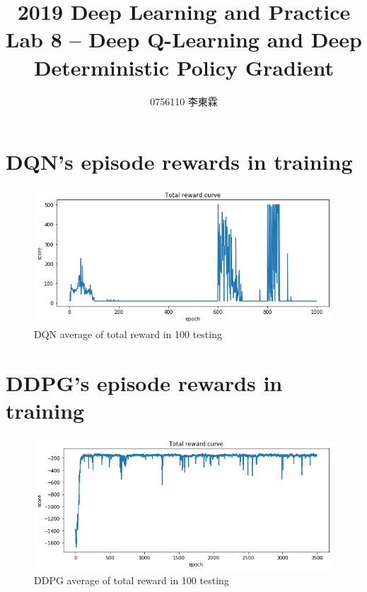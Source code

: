 \documentclass[12pt]{article}
\begin{document}
 
 
\title{2019 Deep Learning and Practice \\ Lab 8 -- Deep Q-Learning and Deep Deterministic Policy Gradient}
\author{0756110 李東霖}

\maketitle
\section{DQN's episode rewards in training}

\begin{figure}[H]
\centering
\includegraphics[width=\linewidth]{Images/dqn-rewards.png}
\caption{DQN average of total reward in 100 testing}
\end{figure}

\section{DDPG's episode rewards in training}

\begin{figure}[H]
\centering
\includegraphics[width=\linewidth]{Images/ddpg-rewards.png} 
\caption{DDPG average of total reward in 100 testing}
\end{figure}
\end{document}
